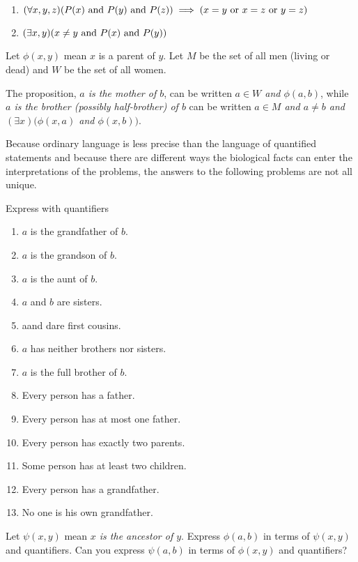 \documentclass{report}
\renewcommand*{\land}{\text{ and }}
\renewcommand*{\lor}{\text{ or }}
\begin{document}
\begin{solution}
\begin{enumerate}[label=(\alph*)]
    \item $(\forall x,y,z)\prn{P(x)\land P(y)\land P(z)}\implies (x=y\lor x=z\lor y=z)$
    \item $(\exists x,y)\prn{x\neq y \land P(x)\land P(y)}$
\end{enumerate}
\end{solution}

\begin{exercise}
Let $\phi(x, y)$ mean $x$ is a parent of $y$. Let $M$ be the set of all men (living or dead)
and $W$ be the set of all women.

The proposition, \textit{$a$ is the mother of $b$}, can be written \textit{$a\in W$ and $\phi(a, b)$}, while \textit{$a$ is the
brother (possibly half-brother) of $b$} can be written \textit{$a\in M$ and $a\neq b$ and $(\exists x) (\phi(x, a)$ and
$\phi(x, b))$}.

Because ordinary language is less precise than the language of quantified statements
and because there are different ways the biological facts can enter the interpretations of
the problems, the answers to the following problems are not all unique.

Express with quantifiers
\begin{enumerate}[label=(\alph*)]
    \item $a$ is the grandfather of $b$.
    \item $a$ is the grandson of $b$.
    \item $a$ is the aunt of $b$. 
    \item $a$ and $b$ are sisters.
    \item aand dare first cousins. 
    \item $a$ has neither brothers nor sisters.
    \item $a$ is the full brother of $b$.
    \item Every person has a father.
    \item Every person has at most one father.
    \item Every person has exactly two parents.
    \item Some person has at least two children.
    \item Every person has a grandfather.
    \item No one is his own grandfather.
\end{enumerate}

Let $\psi(x, y)$ mean \textit{$x$ is the ancestor of $y$}. Express $\phi(a,b)$ in terms of $\psi(x,y)$ and
quantifiers. Can you express $\psi(a, b)$ in terms of $\phi(x,y)$ and quantifiers?
\end{exercise}
\end{document}
